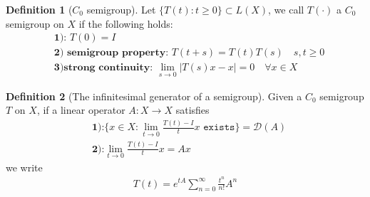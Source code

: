 \documentclass[a4paper,11pt,fleqn]{book}
\theoremstyle{definition}
\newtheorem{definition}{Definition}[section]
\theoremstyle{remark}
\begin{document}
\begin{definition}[$C_0$ semigroup]
	Let $\{T(t) : t \ge 0 \} \subset L(X)$, we call $T(\cdot)$ a $C_0$ semigroup on $X$ if the following holds:
	\begin{align*}
		&\textbf{1): } T(0) = I \\
		&\textbf{2) semigroup property: } T(t + s) = T(t)T(s) \quad s,t \ge 0 \\
		&\textbf{3)strong continuity: } \lim_{ s \rightarrow 0} |T(s)x - x| = 0 \quad \forall x \in X
	\end{align*}
\end{definition}

\begin{definition}[The infinitesimal generator of a semigroup]
	 Given a $C_0$ semigroup $T$ on $X$, if a linear operator $A: X \rightarrow X$ satisfies 
	 \begin{align*}
	 	&\textbf{1):} \{ x \in X: \lim_{ t \rightarrow 0} \frac{T(t) - I}{t}x \texttt{ exists} \} = \mathcal{D}(A)\\
	 	& \textbf{2):} \lim_{t \rightarrow 0} \frac{T(t) - I}{t}x = Ax
	 \end{align*}
	 we write 
	 \begin{align*}
	 	T(t) = e^{t A} \sum_{n = 0}^\infty \frac{t^n}{n!} A^n 
	 \end{align*}
\end{definition}
\end{document}
